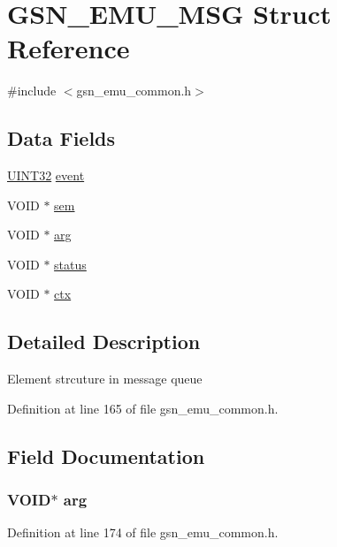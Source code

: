 \hypertarget{a00062}{
\section{GSN\_\-EMU\_\-MSG Struct Reference}
\label{a00062}
}


{\ttfamily \#include $<$gsn\_\-emu\_\-common.h$>$}

\subsection*{Data Fields}
\begin{DoxyCompactItemize}
\item 
\hyperlink{a00660_gae1e6edbbc26d6fbc71a90190d0266018}{UINT32} \hyperlink{a00062_a62ef57f8dfa7ce1e8577994709b26c04}{event}
\item 
VOID $\ast$ \hyperlink{a00062_a9364170a1f540808e145cbcd3c4c97fd}{sem}
\item 
VOID $\ast$ \hyperlink{a00062_ad592ab5f75f8d52be9825f050203b4d3}{arg}
\item 
VOID $\ast$ \hyperlink{a00062_a547fbc73f5b89c67cd48afd6feca9ba4}{status}
\item 
VOID $\ast$ \hyperlink{a00062_add401254b29adaa41706c97d1c8d3e89}{ctx}
\end{DoxyCompactItemize}


\subsection{Detailed Description}
Element strcuture in message queue 

Definition at line 165 of file gsn\_\-emu\_\-common.h.



\subsection{Field Documentation}
\hypertarget{a00062_ad592ab5f75f8d52be9825f050203b4d3}{
\subsubsection[{arg}]{\setlength{\rightskip}{0pt plus 5cm}VOID$\ast$ {\bf arg}}}
\label{a00062_ad592ab5f75f8d52be9825f050203b4d3}


Definition at line 174 of file gsn\_\-emu\_\-common.h.

